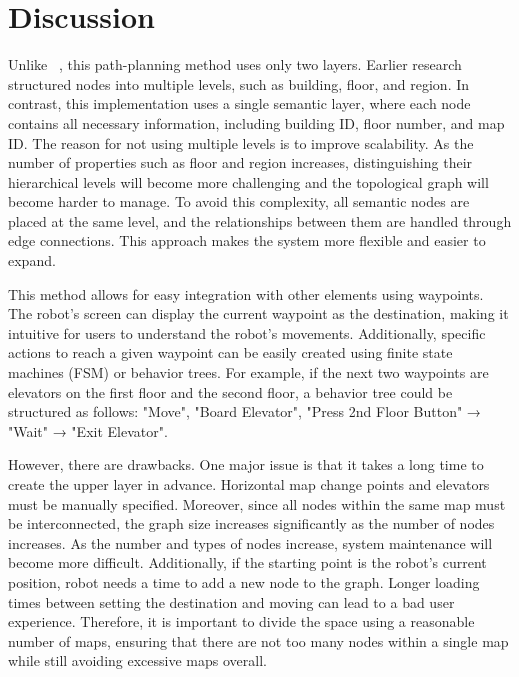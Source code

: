 \documentclass[en]{snu-cse-bsc-thesis}
\begin{document}
\section{Discussion}\label{sec:Discussion}
Unlike ~\cite{MultiStoreyBuildingNavigation}, this path-planning method uses only two layers. Earlier research structured nodes into multiple levels, such as building, floor, and region. In contrast, this implementation uses a single semantic layer, where each node contains all necessary information, including building ID, floor number, and map ID. The reason for not using multiple levels is to improve scalability. As the number of properties such as floor and region increases, distinguishing their hierarchical levels will become more challenging and the topological graph will become harder to manage. To avoid this complexity, all semantic nodes are placed at the same level, and the relationships between them are handled through edge connections. This approach makes the system more flexible and easier to expand.

This method allows for easy integration with other elements using waypoints. The robot's screen can display the current waypoint as the destination, making it intuitive for users to understand the robot's movements. Additionally, specific actions to reach a given waypoint can be easily created using finite state machines (FSM) or behavior trees. For example, if the next two waypoints are elevators on the first floor and the second floor, a behavior tree could be structured as follows: "Move", "Board Elevator", "Press 2nd Floor Button" → "Wait" → "Exit Elevator".

However, there are drawbacks. One major issue is that it takes a long time to create the upper layer in advance. Horizontal map change points and elevators must be manually specified. Moreover, since all nodes within the same map must be interconnected, the graph size increases significantly as the number of nodes increases. As the number and types of nodes increase, system maintenance will become more difficult. Additionally, if the starting point is the robot's current position, robot needs a time to add a new node to the graph. Longer loading times between setting the destination and moving can lead to a bad user experience. Therefore, it is important to divide the space using a reasonable number of maps, ensuring that there are not too many nodes within a single map while still avoiding excessive maps overall.
\end{document}
